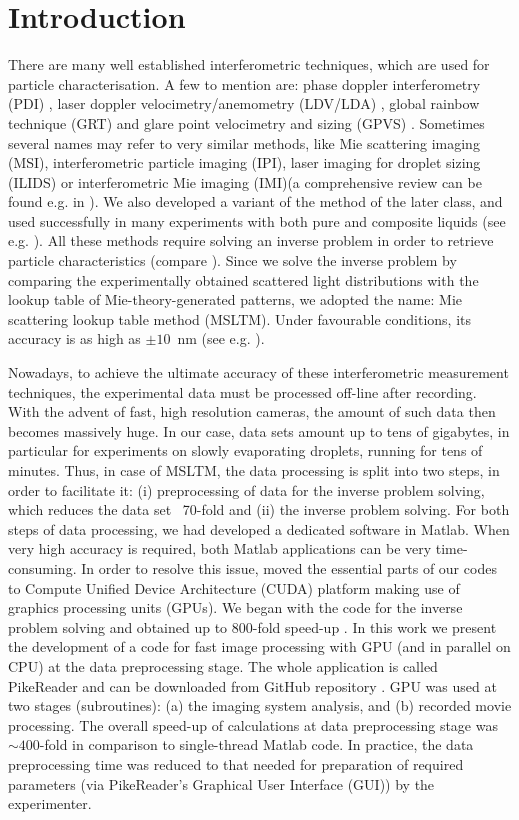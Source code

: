 \documentclass[preprint,review,12pt,dvips]{elsarticle}
\begin{document}
\section{Introduction}
There are many well established interferometric techniques, which are used for particle characterisation. A few to mention
are: phase doppler interferometry (PDI) \cite{Sipperley}, laser doppler velocimetry/anemometry (LDV/LDA) \cite{Rheims},
global rainbow technique (GRT) \cite{Wang_non-sphericity} and glare point velocimetry and sizing (GPVS) \cite{GPVS}.
Sometimes several names may refer to very similar methods, like Mie scattering imaging (MSI), interferometric particle
imaging (IPI), laser imaging for droplet sizing (ILIDS) or interferometric Mie imaging (IMI)(a comprehensive review can be
found e.g. in \cite{Grassmann}). We also developed a variant of the method of the later class, and used successfully in
many experiments with both pure and composite liquids (see e.g. \cite{RoP,weightvsscatt,Hi-precission,HK-soft_matter}).
All these methods require solving an inverse problem in order to retrieve particle characteristics (compare
\cite{RieflerWriedt}). Since we solve the inverse problem by comparing the experimentally obtained scattered light
distributions with the lookup table of Mie-theory-generated patterns, we adopted the name: Mie scattering lookup table
method (MSLTM). Under favourable conditions, its accuracy is as high as $\pm 10$~nm (see e.g. \cite{Hi-precission}).

    Nowadays, to achieve the ultimate accuracy of these interferometric measurement techniques, the experimental data must be processed
    off-line after recording. With the advent of fast, high resolution cameras, the amount of such data then becomes massively huge.
    In our case, data sets amount up to tens of gigabytes, in particular for experiments on slowly evaporating droplets, running for tens
    of minutes. Thus, in case of MSLTM, the data processing is split into two steps, in order to facilitate it: (i)
    preprocessing of data for the inverse problem solving, which reduces the data set ~70-fold and (ii) the inverse
    problem solving. For both steps of data processing, we had developed a dedicated software in Matlab. When very high accuracy is required,
    both Matlab applications can be very time-consuming. In order to resolve this issue, moved the essential parts of our codes
    to Compute Unified Device Architecture (CUDA) platform making use of graphics processing units (GPUs). We began with the
    code for the inverse problem solving and obtained up to 800-fold speed-up \cite{Smigacz}. In this work we present the
    development of a code for fast image processing with GPU (and in parallel on CPU) at the data preprocessing stage. The
    whole application is called PikeReader and can be downloaded from GitHub repository \cite{PikeReader}. GPU was used at two
    stages (subroutines): (a) the imaging system analysis, and (b) recorded movie processing. The overall speed-up of
    calculations at data preprocessing stage was $\sim 400$-fold in comparison to single-thread Matlab code. In practice, the
    data preprocessing time was reduced to that needed for preparation of required parameters (via PikeReader's Graphical User
    Interface (GUI)) by the experimenter.
\end{document}
